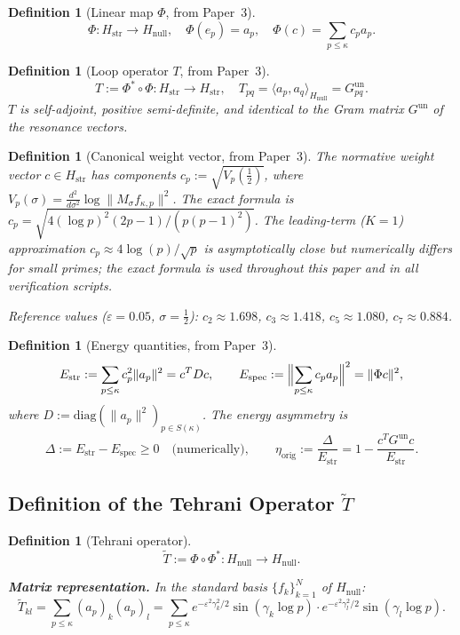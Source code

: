 \documentclass[11pt]{article}
\newtheorem{definition}[theorem]{Definition}
\newcommand{\Hstr}{H_{\mathrm{str}}}
\newcommand{\Hnull}{H_{\mathrm{null}}}
\newcommand{\Estr}{E_{\mathrm{str}}}
\newcommand{\Espec}{E_{\mathrm{spec}}}
\newcommand{\etaorig}{\eta_{\mathrm{orig}}}
\newcommand{\Gun}{G^{\mathrm{un}}}
\newcommand{\Tt}{\widetilde{T}}
\begin{document}
\begin{definition}[Linear map $\Phi$, from Paper~3]
\[
\Phi\colon\Hstr\to\Hnull,\quad
\Phi(e_p) = a_p,\quad
\Phi(c) = \sum_{p\leq\kappa}c_p a_p.
\]
\end{definition}

\begin{definition}[Loop operator $T$, from Paper~3]
\[
T := \Phi^*\circ\Phi\colon\Hstr\to\Hstr,\quad
T_{pq} = \langle a_p,a_q\rangle_{\Hnull} = G^{\mathrm{un}}_{pq}.
\]
$T$ is self-adjoint, positive semi-definite, and identical to the Gram
matrix $\Gun$ of the resonance vectors.
\end{definition}

\begin{definition}[Canonical weight vector, from Paper~3]
The normative weight vector $c\in\Hstr$ has components
$c_p := \sqrt{V_p(\tfrac{1}{2})}$,
where $V_p(\sigma) = \tfrac{d^2}{d\sigma^2}\log\|M_\sigma f_{\kappa,p}\|^2$.
The exact formula is
$c_p = \sqrt{4(\log p)^2(2p-1)/(p(p-1)^2)}$.
The leading-term ($K=1$) approximation $c_p \approx 4\log(p)/\sqrt{p}$
is asymptotically close but numerically differs for small primes;
the exact formula is used throughout this paper and in all verification scripts.

Reference values ($\varepsilon=0.05$, $\sigma=\tfrac{1}{2}$):
$c_2\approx 1.698$, $c_3\approx 1.418$, $c_5\approx 1.080$,
$c_7\approx 0.884$.
\end{definition}

\begin{definition}[Energy quantities, from Paper~3]
\[
\Estr := \sum_{p\leq\kappa}c_p^2\|a_p\|^2 = c^T Dc,
\qquad
\Espec := \Bigl\|\sum_{p\leq\kappa}c_p a_p\Bigr\|^2 = \|\Phi c\|^2,
\]
where $D := \mathrm{diag}(\|a_p\|^2)_{p\in S(\kappa)}$.
The energy asymmetry is
\[
\Delta := \Estr - \Espec \geq 0\quad\text{(numerically)},
\qquad
\etaorig := \frac{\Delta}{\Estr}
= 1 - \frac{c^T\Gun c}{\Estr}.
\]
\end{definition}

\subsection{Definition of the Tehrani Operator $\widetilde{T}$}

\begin{definition}[Tehrani operator]\label{def:Tt}
\[
\Tt := \Phi\circ\Phi^*\colon\Hnull\to\Hnull.
\]

\textbf{Matrix representation.}
In the standard basis $\{f_k\}_{k=1}^N$ of $\Hnull$:
\[
\Tt_{kl}
= \sum_{p\leq\kappa}(a_p)_k(a_p)_l
= \sum_{p\leq\kappa}
e^{-\varepsilon^2\gamma_k^2/2}\sin(\gamma_k\log p)
\cdot
e^{-\varepsilon^2\gamma_l^2/2}\sin(\gamma_l\log p).
\]
\end{definition}
\end{document}

